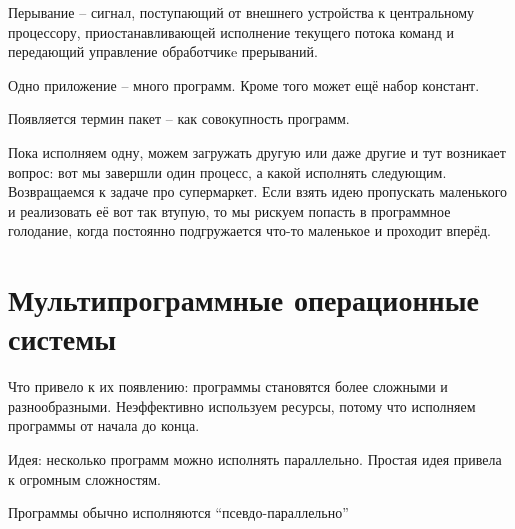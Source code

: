 \documentclass{book}
\theoremstyle{definition}
\begin{document}
    \begin{definition}
        Перывание -- сигнал, поступающий от внешнего устройства к центральному процессору, приостанавливающей исполнение текущего потока команд и передающий управление обработчикe прерываний.
    \end{definition}

    \begin{problem}
        
        Одно приложение -- много программ. Кроме того может ещё набор констант.

        Появляется термин пакет -- как совокупность программ.

        Пока исполняем одну, можем загружать другую или даже другие и тут возникает вопрос: вот мы завершли один процесс, а какой исполнять следующим. Возвращаемся к задаче про супермаркет. Если взять идею пропускать маленького и реализовать её вот так втупую, то мы рискуем попасть в программное голодание, когда постоянно подгружается что-то маленькое и проходит вперёд.

    \end{problem}

    \section{Мультипрограммные операционные системы}

    Что привело к их появлению: программы становятся более сложными и разнообразными. Неэффективно используем ресурсы, потому что исполняем программы от начала до конца.

    Идея: несколько программ можно исполнять параллельно. Простая идея привела к огромным сложностям.

    Программы обычно исполняются ``псевдо-параллельно''
\end{document}
